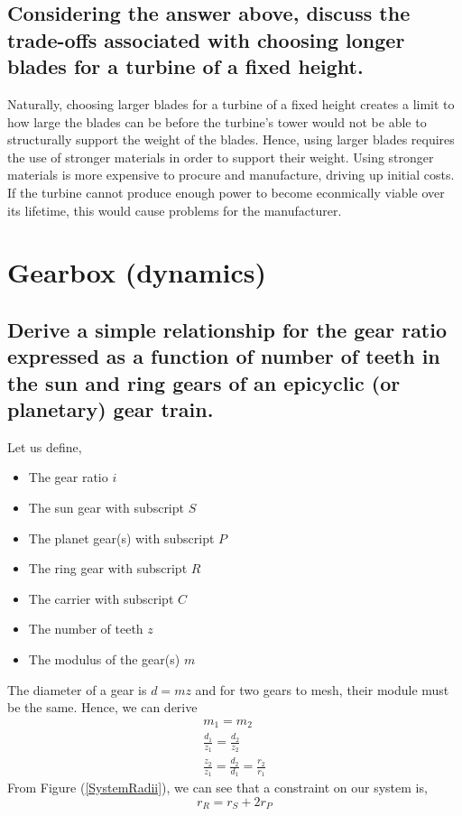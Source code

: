 \documentclass[12pt]{article}
\numberwithin{equation}{section}
\begin{document}
\begin{flushleft}
\subsection{Considering the answer above, discuss the trade-offs associated with choosing longer blades for a turbine of a fixed height.}
Naturally, choosing larger blades for a turbine of a fixed height creates a limit to how large the blades can be before the turbine's tower would not be able to structurally support the weight of the blades. Hence, using larger blades requires the use of stronger materials in order to support their weight. Using stronger materials is more expensive to procure and manufacture, driving up initial costs. If the turbine cannot produce enough power to become econmically viable over its lifetime, this would cause problems for the manufacturer.

\section{Gearbox (dynamics)}
\subsection{Derive a simple relationship for the gear ratio expressed as a function of number of teeth in the sun and ring gears of an epicyclic (or planetary) gear train.}
Let us define,
\begin{itemize} 
  \item The gear ratio $i$
  \item The sun gear with subscript $S$
  \item The planet gear(s) with subscript $P$ 
  \item The ring gear with subscript $R$
  \item The carrier with subscript $C$
  \item The number of teeth $z$
  \item The modulus of the gear(s) $m$
\end{itemize}

The diameter of a gear is $d = mz$ and for two gears to mesh, their module must be the same. Hence, we can derive
\begin{gather}
  m_1 = m_2\\
  \frac{d_1}{z_1} = \frac{d_2}{z_2}\\
  \frac{z_2}{z_1} = \frac{d_2}{d_1} = \frac{r_2}{r_1}
\end{gather}
From Figure (\ref{SystemRadii}), we can see that a constraint on our system is,
\begin{equation}
  r_R = r_S + 2r_P
  \label{radiiRelationship}
\end{equation}


\end{flushleft}
\end{document}
